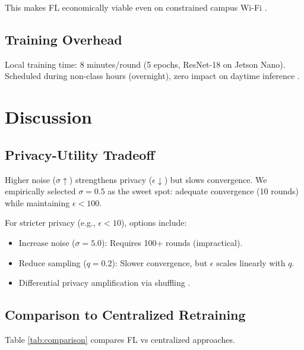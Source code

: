 \documentclass[conference]{IEEEtran}
\begin{document}
This makes FL economically viable even on constrained campus Wi-Fi \cite{b30}.

\subsection{Training Overhead}

Local training time: 8 minutes/round (5 epochs, ResNet-18 on Jetson Nano). Scheduled during non-class hours (overnight), zero impact on daytime inference \cite{b31}.

\section{Discussion}

\subsection{Privacy-Utility Tradeoff}

Higher noise ($\sigma \uparrow$) strengthens privacy ($\epsilon \downarrow$) but slows convergence. We empirically selected $\sigma=0.5$ as the sweet spot: adequate convergence (10 rounds) while maintaining $\epsilon < 100$.

For stricter privacy (e.g., $\epsilon < 10$), options include:
\begin{itemize}
    \item Increase noise ($\sigma=5.0$): Requires 100+ rounds (impractical).
    \item Reduce sampling ($q=0.2$): Slower convergence, but $\epsilon$ scales linearly with $q$.
    \item Differential privacy amplification via shuffling \cite{b32}.
\end{itemize}

\subsection{Comparison to Centralized Retraining}

Table \ref{tab:comparison} compares FL vs centralized approaches.
\end{document}
